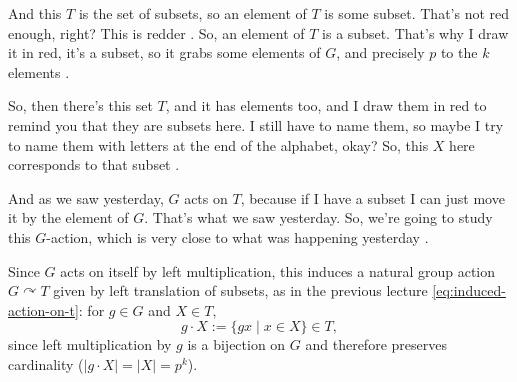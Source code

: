 \begin{proofWrapper}
\begin{speech}[00:04:17 - 00:05:45]
And this $T$ is the set of subsets, so an element of $T$ is some subset. That's not red enough, right? This is redder . So, an element of $T$ is a subset. That's why I draw it in red, it's a subset, so it grabs some elements of $G$, and precisely $p$ to the $k$ elements .

So, then there's this set $T$, and it has elements too, and I draw them in red to remind you that they are subsets here. I still have to name them, so maybe I try to name them with letters at the end of the alphabet, okay? So, this $X$ here corresponds to that subset .

And as we saw yesterday, $G$ acts on $T$, because if I have a subset I can just move it by the element of $G$. That's what we saw yesterday. So, we're going to study this $G$-action, which is very close to what was happening yesterday .
\end{speech}

\begin{content}
Since $G$ acts on itself by left multiplication, this induces a natural group action $G \curvearrowright T$ given by left translation of subsets, as in the previous lecture \eqref{eq:induced-action-on-t}: for $g \in G$ and $X \in T$,
\[
g \cdot X := \{ g x \mid x \in X \} \in T,
\]
since left multiplication by $g$ is a bijection on $G$ and therefore preserves cardinality ($|g \cdot X| = |X| = p^k$).


\end{content}
\end{proofWrapper}
